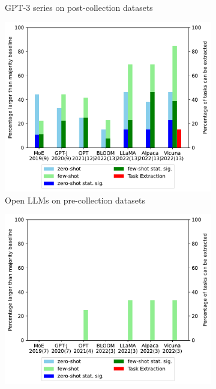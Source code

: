 \documentclass[letterpaper]{article} %
\begin{document}
\begin{figure}[t]
\begin{subfigure}[b]{0.45\textwidth}
            \caption[]%
            {GPT-3 series on post-collection datasets}
            \label{fig:Few shot performance for old datasets1}
        \end{subfigure}
        \begin{subfigure}[b]{0.45\textwidth}
            \centering
            \includegraphics[scale=0.45]{img/old-dataset-percentage-recent-llm.pdf}
            \caption[]%
            {Open LLMs on pre-collection datasets}
            \label{fig:Zero shot performance for old datasets2}
        \end{subfigure}
        \begin{subfigure}[b]{0.45\textwidth}
            \centering
            \includegraphics[scale=0.45]{img/new-dataset-percentage-recent-llm.pdf}

\end{subfigure}
\end{figure}
\end{document}
